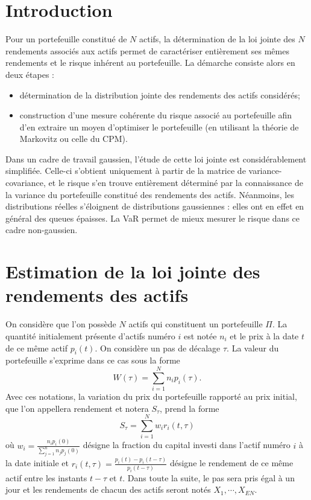 \documentclass{article}
\begin{document}
\newpage 

\tableofcontents

\newpage

\section{Introduction}

Pour un portefeuille constitué de $N$ actifs, la détermination de la loi jointe des $N$ rendements  associés aux actifs permet de caractériser entièrement ses mêmes rendements et le risque inhérent au portefeuille. La démarche consiste alors en deux étapes :
\begin{itemize}
\item détermination de la distribution jointe des rendements des actifs considérés;
\item construction d'une mesure cohérente du risque associé au portefeuille afin d'en extraire un moyen d'optimiser le portefeuille (en utilisant la théorie de Markovitz ou celle du CPM).
\end{itemize}
Dans un cadre de travail gaussien, l'étude de cette loi jointe est considérablement simplifiée. Celle-ci s'obtient uniquement à partir de la matrice de variance-covariance, et le risque s'en trouve entièrement déterminé par la connaissance de la variance du portefeuille constitué des rendements des actifs. Néanmoins, les distributions réelles s'éloignent de distributions gaussiennes : elles ont en effet en général des queues épaisses. La VaR permet de mieux mesurer le risque dans ce cadre non-gaussien.

\section{Estimation de la loi jointe des rendements des actifs}

On considère que l'on possède $N$ actifs qui constituent un portefeuille $\Pi$. La quantité initialement présente d'actifs numéro $i$ est notée $n_{i}$ et le prix à la date $t$de ce même actif $p_{i}(t)$.  On considère un pas de décalage $\tau$. La valeur du portefeuille s'exprime dans ce cas sous la forme
\begin{equation}
W (\tau )=\sum_{i= 1}^{N}n_{i}p_{i} (\tau ).
\end{equation}
Avec ces notations, la variation du prix du portefeuille rapporté au prix initial, que l'on appellera rendement et notera $ S_{\tau} $, prend la forme
\begin{equation}
S_{\tau}=\sum_{i= 1}^{N}w_{i}r_{i} (t,\tau )
\end{equation}
où $ w_{i}=\frac{n_{i}p_{i}(0)}{\sum_{j=1}^{n}n_{j}p_{j}(0)} $ désigne la fraction du capital investi dans l'actif numéro $ i $ à la date initiale et $ r_{i}(t,\tau )=\frac{p_{i}(t)-p_{i}(t-\tau )}{p_{i}(t-\tau )} $ désigne le rendement de ce même actif entre les instants $t-\tau$ et $t$.
Dans toute la suite, le pas sera pris égal à un jour et les rendements de chacun des actifs seront notés $ X_{ 1},\cdots , X_{EN} $.
\end{document}
